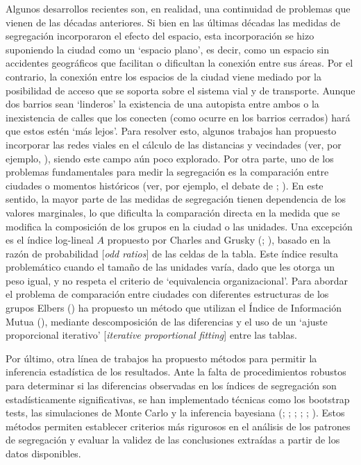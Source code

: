 \documentclass[
  spanish,
  a4paper,%
  chapterprefix=true,%
  DIV=calc,%
  twoside]{scrbook}%
\begin{document}
Algunos desarrollos recientes son, en realidad, una continuidad de
problemas que vienen de las décadas anteriores. Si bien en las últimas
décadas las medidas de segregación incorporaron el efecto del espacio,
esta incorporación se hizo suponiendo la ciudad como un `espacio plano',
es decir, como un espacio sin accidentes geográficos que facilitan o
dificultan la conexión entre sus áreas. Por el contrario, la conexión
entre los espacios de la ciudad viene mediado por la posibilidad de
acceso que se soporta sobre el sistema vial y de transporte. Aunque dos
barrios sean `linderos' la existencia de una autopista entre ambos o la
inexistencia de calles que los conecten (como ocurre en los barrios
cerrados) hará que estos estén `más lejos'. Para resolver esto, algunos
trabajos han propuesto incorporar las redes viales en el cálculo de las
distancias y vecindades (ver, por ejemplo, ), siendo este
campo aún poco explorado. Por otra parte, uno de los problemas
fundamentales para medir la segregación es la comparación entre ciudades
o momentos históricos (ver, por ejemplo, el debate de ; ). En este sentido, la mayor parte de las medidas de
segregación tienen dependencia de los valores marginales, lo que
dificulta la comparación directa en la medida que se modifica la
composición de los grupos en la ciudad o las unidades. Una excepción es
el índice log-lineal \(A\) propuesto por Charles and Grusky
(; ), basado en la razón de probabilidad {[}\emph{odd
ratios}{]} de las celdas de la tabla. Este índice resulta problemático
cuando el tamaño de las unidades varía, dado que les otorga un peso
igual, y no respeta el criterio de `equivalencia organizacional'. Para
abordar el problema de comparación entre ciudades con diferentes
estructuras de los grupos Elbers () ha propuesto un método que
utilizan el Índice de Información Mutua (), mediante
descomposición de las diferencias y el uso de un `ajuste proporcional
iterativo' {[}\emph{iterative proportional fitting}{]} entre las tablas.

Por último, otra línea de trabajos ha propuesto métodos para permitir la
inferencia estadística de los resultados. Ante la falta de
procedimientos robustos para determinar si las diferencias observadas en
los índices de segregación son estadísticamente significativas, se han
implementado técnicas como los bootstrap tests, las simulaciones de
Monte Carlo y la inferencia bayesiana (; ; ; ; ; ). Estos métodos permiten
establecer criterios más rigurosos en el análisis de los patrones de
segregación y evaluar la validez de las conclusiones extraídas a partir
de los datos disponibles.
\end{document}
